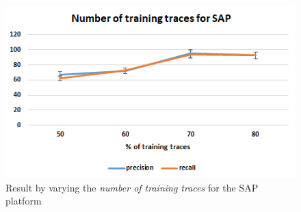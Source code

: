 \begin{itemize}
\begin{figure}[ht]
    \centering
    \includegraphics[scale=0.75,keepaspectratio = true]{Graphics/SAP_traces.png}
    \caption{Result by varying the \textit{number of training traces} for the SAP platform}
    \label{fig:SAP_traces}
\end{figure}

\end{itemize}

\endinput
=====================================================================
